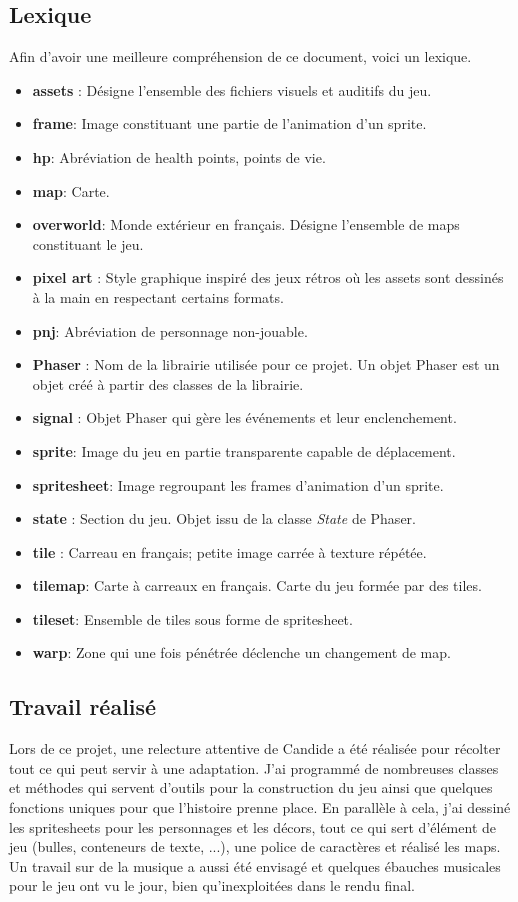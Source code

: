 \documentclass[11pt]{article}
\begin{document}
\subsection{Lexique}
Afin d'avoir une meilleure compréhension de ce document, voici un lexique. \\
\begin{itemize}{}{}
\item \textbf{assets} : Désigne l'ensemble des fichiers visuels et auditifs du jeu.
\item \textbf{frame}: Image constituant une partie de l'animation d'un sprite.
\item \textbf{hp}: Abréviation de health points, points de vie.
\item \textbf{map}: Carte.
\item \textbf{overworld}: Monde extérieur en français. Désigne l'ensemble de maps constituant le jeu.
\item \textbf{pixel art} : Style graphique inspiré des jeux rétros où les assets sont dessinés à la main en respectant certains formats.
\item \textbf{pnj}: Abréviation de personnage non-jouable.
\item \textbf{Phaser} : Nom de la librairie utilisée pour ce projet. Un objet Phaser est un objet créé à partir des classes de la librairie.
\item \textbf{signal} : Objet Phaser qui gère les événements et leur enclenchement.
\item \textbf{sprite}: Image du jeu en partie transparente capable de déplacement.
\item \textbf{spritesheet}: Image regroupant les frames d'animation d'un sprite.
\item \textbf{state} : Section du jeu. Objet issu de la classe \textit{State} de Phaser.
\item \textbf{tile} : Carreau en français; petite image carrée à texture répétée.
\item \textbf{tilemap}: Carte à carreaux en français. Carte du jeu formée par des tiles.
\item \textbf{tileset}: Ensemble de tiles sous forme de spritesheet.
\item \textbf{warp}: Zone qui une fois pénétrée déclenche un changement de map.
\end{itemize}

\subsection{Travail réalisé}
Lors de ce projet, une relecture attentive de Candide a été réalisée pour récolter tout ce qui peut servir à une adaptation. J'ai programmé de nombreuses classes et méthodes qui servent d'outils pour la construction du jeu ainsi que quelques fonctions uniques pour que l'histoire prenne place. En parallèle à cela, j'ai dessiné les spritesheets pour les personnages et les décors, tout ce qui sert d'élément de jeu (bulles, conteneurs de texte, ...), une police de caractères et réalisé les maps. Un travail sur de la musique a aussi été envisagé et quelques ébauches musicales pour le jeu ont vu le jour, bien qu'inexploitées dans le rendu final.
\end{document}
